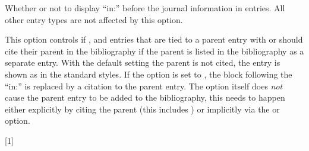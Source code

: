 \documentclass[DIV=9]{scrartcl}
\begin{document}
\begin{optionlist}
Whether or not to display \enquote{in:} before the journal information in
 entries.
All other entry types are not affected by this option.

\begin{bibexample}[title={\kvopt{articlein}{true}}]
\makeatletter
\togglefalse{bbx:doi}
\toggletrue{bbx:articlein}
\smallskip\par{}
\makeatother
\end{bibexample}

\begin{bibexample}[title={\kvopt{articlein}{false}}]
\togglefalse{bbx:doi}
\togglefalse{bbx:articlein}
\makeatletter
{}
\smallskip\par{}
\makeatother
\end{bibexample}

This option controls if ,  and
 entries that are tied to a parent entry with
 or  should cite their parent in the
bibliography if the parent is listed in the bibliography as a separate entry.
With the default setting  the parent is not cited, the
entry is shown as in the standard styles. If the option is set to
, the block following the \enquote{in:} is replaced by a citation
to the parent entry.
The option itself does \emph{not} cause the parent entry to be added to the
bibliography, this needs to happen either explicitly by citing the parent
(this includes ) or implicitly via the  or
 option.

\nocite{westfahl:frontier}
\begin{bibexample}[title={\kvopt{citeinxref}{true}}]
\makeatletter
{}[1]{%
  }
\makeatother
\toggletrue{bbx:citeinxref}
\end{bibexample}


\end{optionlist}
\end{document}
